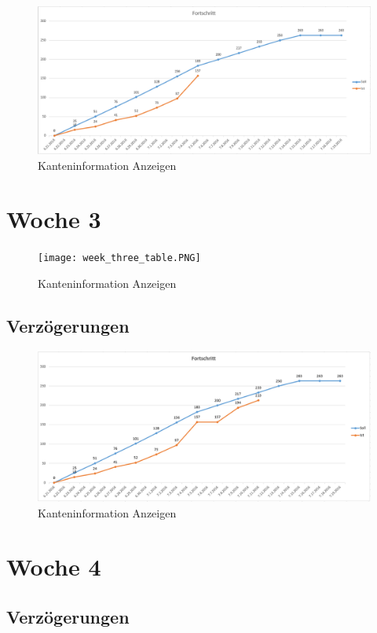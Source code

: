 \begin{figure}[!htbp]
	\centering
	\includegraphics[width=380pt]{resourcen/week_two_diagram.PNG}
	\caption{Kanteninformation Anzeigen}
	\label{fig:week_two_diagram}
\end{figure}

\section{Woche 3}
\begin{figure}[!htbp]
	\centering
	\texttt{[image: week\_three\_table.PNG]}
	\caption{Kanteninformation Anzeigen}
	\label{fig:week_three_table}
\end{figure}
\subsection{Verzögerungen}
\begin{figure}[!htbp]
	\centering
	\includegraphics[width=380pt]{resourcen/week_three_diagram.PNG}
	\caption{Kanteninformation Anzeigen}
	\label{Restliche nicht abgeschlossene Aufgaben für Woche 3 und 4}
\end{figure}
\section{Woche 4}
\subsection{Verzögerungen}